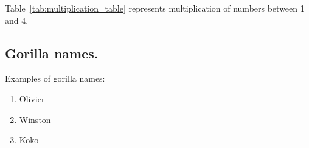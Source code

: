\newpage
Table~\ref{tab:multiplication_table} represents multiplication of numbers between 1 and 4.

\subsection{\hspace{2em}Gorilla names.}
Examples of gorilla names:
\begin{enumerate}
    \item Olivier
    \item Winston
    \item Koko
\end{enumerate}